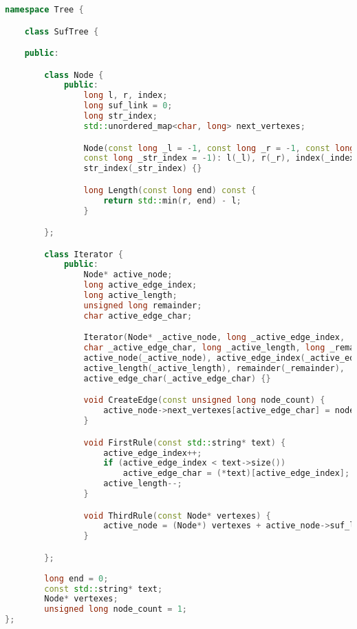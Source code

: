 \begin{lstlisting}[language=c++]
namespace Tree {

    class SufTree {

    public:

        class Node {
            public:
                long l, r, index;
                long suf_link = 0;
                long str_index;
                std::unordered_map<char, long> next_vertexes;

                Node(const long _l = -1, const long _r = -1, const long _index = -1, 
                const long _str_index = -1): l(_l), r(_r), index(_index), 
                str_index(_str_index) {}

                long Length(const long end) const {
                    return std::min(r, end) - l;
                }

        };

        class Iterator {
            public:
                Node* active_node;
                long active_edge_index;
                long active_length;
                unsigned long remainder;
                char active_edge_char;

                Iterator(Node* _active_node, long _active_edge_index,
                char _active_edge_char, long _active_length, long _remainder): 
                active_node(_active_node), active_edge_index(_active_edge_index), 
                active_length(_active_length), remainder(_remainder), 
                active_edge_char(_active_edge_char) {}

                void CreateEdge(const unsigned long node_count) {
                    active_node->next_vertexes[active_edge_char] = node_count;
                }

                void FirstRule(const std::string* text) {
                    active_edge_index++;
                    if (active_edge_index < text->size())
                        active_edge_char = (*text)[active_edge_index];
                    active_length--;
                }

                void ThirdRule(const Node* vertexes) {
                    active_node = (Node*) vertexes + active_node->suf_link;
                }

        };
        
        long end = 0;
        const std::string* text;
        Node* vertexes;
        unsigned long node_count = 1;
};
\end{lstlisting}

